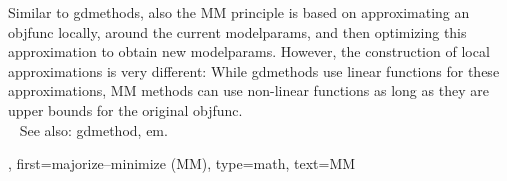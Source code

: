 {{\begin{figure}
			\end{figure}
			 Similar to \glspl{gdmethod}, also the MM principle is based on approximating an 
			 \gls{objfunc} locally, around the current \glspl{modelparam}, and then optimizing 
			 this approximation to obtain new \glspl{modelparam}. However, the construction 
			 of local approximations is very different: While \glspl{gdmethod} use linear \glspl{function} 
			 for these approximations, MM methods can use non-linear \glspl{function} as long as 
			 they are upper bounds for the original \gls{objfunc}. 
			 \\ 
				 See also: \gls{gdmethod}, \gls{em}.},
first={majorize–minimize (MM)},
type=math, 
text={MM}
}


